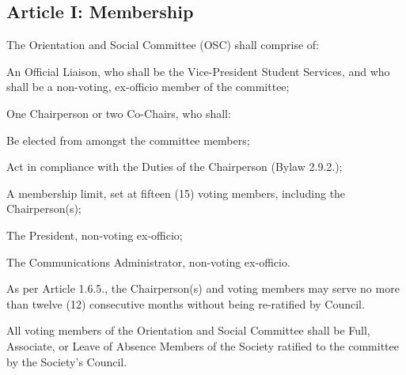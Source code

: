 \subsection{Article I: Membership}
\begin{longenum}[ label*=\thesubsection.\arabic*., align=left] 
	\item The Orientation and Social Committee (OSC) shall comprise of:
		\begin{longenum}[label*=\arabic*., align=left]	
		\item An Official Liaison, who shall be the Vice-President Student Services, and who shall be a non-voting, ex-officio member of the committee;
		\item One Chairperson or two Co-Chairs, who shall:
			\begin{longenum}[label*=\arabic*., align=left]	
			\item Be elected from amongst the committee members;
			\item Act in compliance with the Duties of the Chairperson (Bylaw 2.9.2.);
			\end{longenum}						
		\item A membership limit, set at fifteen (15) voting members, including the Chairperson(s);
		\item The President, non-voting ex-officio;
		\item The Communications Administrator, non-voting ex-officio.		
		\end{longenum}
	\item As per Article 1.6.5., the Chairperson(s) and voting members may serve no more than twelve (12) consecutive months without being re-ratified by Council.
	\item All voting members of the Orientation and Social Committee shall be Full, Associate, or Leave of Absence Members of the Society ratified to the committee by the Society's Council.
\end{longenum}

